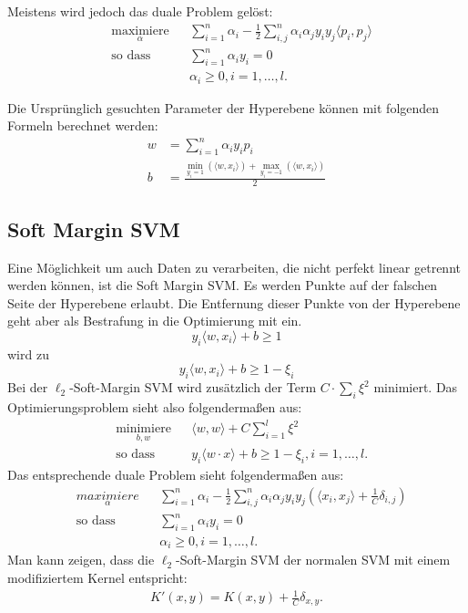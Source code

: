\documentclass{scrartcl}
\begin{document}
Meistens wird jedoch das duale Problem gelöst:
\begin{align}
&\underset{\alpha}{\text{maximiere}} && \sum_{i=1}^n \alpha_i - \frac{1}{2} \sum_{i,j}^n \alpha_i \alpha_j y_i y_j \langle p_i, p_j \rangle  \\
&\text{so dass } && \sum_{i=1}^n \alpha_i y_i = 0 \\
&&&  \alpha_i \geq 0, i = 1, \ldots  ,l.
\end{align}

Die Ursprünglich gesuchten Parameter der Hyperebene können mit folgenden Formeln berechnet werden:
\begin{align}
w &= \sum_{i=1}^n \alpha_i y_i p_i \\
b &= \frac{\min_{y_i = 1}(\langle w,x_i \rangle ) + \max_{y_i = -1}(\langle w,x_i \rangle)}{2}
\end{align}

\subsection{Soft Margin SVM}
Eine Möglichkeit um auch Daten zu verarbeiten, die nicht perfekt linear getrennt werden können, ist die Soft Margin SVM.
Es werden Punkte auf der falschen Seite der Hyperebene erlaubt.
Die Entfernung dieser Punkte von der Hyperebene geht aber als Bestrafung in die Optimierung mit ein.
\begin{equation}
y_i \langle w,x_i\rangle + b \geq 1
\end{equation}
wird zu
\begin{equation}
y_i \langle w,x_i\rangle + b \geq 1 - \xi_i
\end{equation}
Bei der $\ell_2$-Soft-Margin SVM wird zusätzlich der Term $C \cdot \sum_i \xi^2$ minimiert. Das Optimierungsproblem sieht also folgendermaßen aus:
\begin{align}
&\underset{b,w}{\text{minimiere}} &&\langle w,w \rangle + C \sum_{i=1}^l \xi^2\\
&\text{so dass } && y_i \langle w \cdot x \rangle + b \geq 1 - \xi_i , i = 1, \ldots , l. \nonumber
\end{align}
Das entsprechende duale Problem sieht folgendermaßen aus:
\begin{align}
&\underset{\alpha}{maximiere} && \sum_{i=1}^n \alpha_i - \frac{1}{2} \sum_{i,j}^n \alpha_i \alpha_j y_i y_j \left( \langle x_i, x_j \rangle + \frac{1}{C} \delta_{i,j}\right)  \\
&\text{so dass } && \sum_{i=1}^n \alpha_i y_i = 0 \\
&&&  \alpha_i \geq 0, i = 1, \ldots  ,l.
\end{align}
Man kann zeigen, dass die $\ell_2$-Soft-Margin SVM der normalen SVM mit einem modifiziertem Kernel entspricht:
\begin{align}
K'(x,y) = K(x,y) + \frac{1}{C} \delta_{x,y}.
\end{align}
\end{document}
